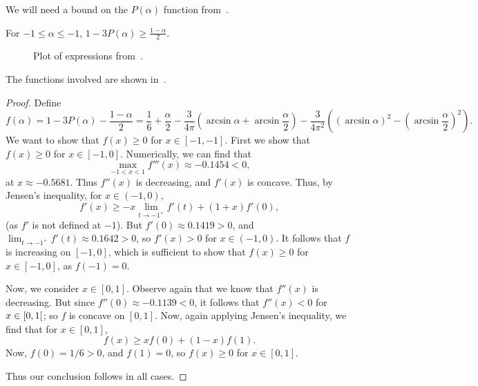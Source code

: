 \documentclass[a4paper,11pt, DIV=11]{scrartcl}
\theoremstyle{plain}
\theoremstyle{definition}
\begin{document}
We will need a bound on the $P(\alpha)$ function from~.

\begin{lemma}\label{lem:ineq}
    For $-1 \leq \alpha \leq -1$, $1 - 3P(\alpha) \geq \frac{1 - \alpha}{2}$.
\end{lemma}
\begin{figure}
\begin{center}
\end{center}
\caption{Plot of expressions from~.}\label{fig:plots}
\end{figure}
The functions involved are shown in~.
\begin{proof}
    Define 
    \[
    f(\alpha) = 1 - 3P(\alpha) - \frac{1 - \alpha}{2} = \frac{1}{6} + \frac{\alpha}{2} - \frac{3}{4\pi}\left(\arcsin \alpha + \arcsin \frac{\alpha}{2}\right) - \frac{3}{4\pi^2}\left({\left(\arcsin \alpha\right)}^2 - {\left(\arcsin \frac{\alpha}{2}\right)}^2\right).
    \]
    We want to show that $f(x) \geq 0$ for $x \in [-1, -1]$. First we show that $f(x) \geq 0$ for $x \in [-1, 0]$. Numerically, we can find that
    \[
    \max_{-1 < x < 1} f'''(x) \approx -0.1454 < 0,
    \]
    at $x \approx-0.5681$. Thus $f''(x)$ is decreasing, and $f'(x)$ is concave. Thus, by Jensen's inequality, for $x \in (-1, 0)$,
    \[
    f'(x) \geq  -x\lim_{t \to -1^+}f'(t) + (1+x)f'(0),
    \]
    (as $f'$ is not defined at $-1$). But $f'(0) \approx 0.1419 > 0$, and $\lim_{t \to -1^+} f'(t) \approx 0.1642 > 0$, so $f'(x) > 0$ for $x \in (-1, 0)$. It follows that $f$ is increasing on $[-1, 0]$, which is sufficient to show that $f(x) \geq 0$ for $x \in [-1, 0]$, as $f(-1) = 0$.

    Now, we consider $x \in [0, 1]$. Observe again that we know that $f''(x)$ is decreasing. But since $f''(0) \approx -0.1139 < 0$, it follows that $f''(x) < 0$ for $x \in \interval[open right]{0}{1}$; so $f$ is concave on $[0, 1]$. Now, again applying Jensen's inequality, we find that for $x \in [0, 1]$,
    \[
    f(x) \geq xf(0) + (1 - x) f(1).
    \]
    Now, $f(0) = 1/6 > 0$, and $f(1) = 0$, so $f(x) \geq 0$ for $x \in [0, 1]$.

    Thus our conclusion follows in all cases.
\end{proof}
\end{document}
